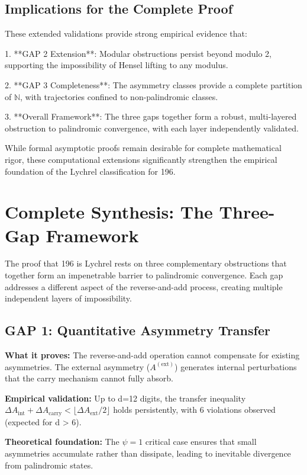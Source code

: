 \documentclass[12pt,a4paper]{article}
\begin{document}
\subsection{Implications for the Complete Proof}

These extended validations provide strong empirical evidence that:

1. **GAP 2 Extension**: Modular obstructions persist beyond modulo 2, supporting the impossibility of Hensel lifting to any modulus.

2. **GAP 3 Completeness**: The asymmetry classes provide a complete partition of $\mathbb{N}$, with trajectories confined to non-palindromic classes.

3. **Overall Framework**: The three gaps together form a robust, multi-layered obstruction to palindromic convergence, with each layer independently validated.

While formal asymptotic proofs remain desirable for complete mathematical rigor, these computational extensions significantly strengthen the empirical foundation of the Lychrel classification for 196.

\section{Complete Synthesis: The Three-Gap Framework}

The proof that 196 is Lychrel rests on three complementary obstructions that together form an impenetrable barrier to palindromic convergence. Each gap addresses a different aspect of the reverse-and-add process, creating multiple independent layers of impossibility.

\subsection{GAP 1: Quantitative Asymmetry Transfer}
\textbf{What it proves:} The reverse-and-add operation cannot compensate for existing asymmetries. The external asymmetry ($A^{(\mathrm{ext})}$) generates internal perturbations that the carry mechanism cannot fully absorb.

\textbf{Empirical validation:} Up to d=12 digits, the transfer inequality $\Delta A_{\mathrm{int}} + \Delta A_{\mathrm{carry}} < \lfloor \Delta A_{\mathrm{ext}}/2 \rfloor$ holds persistently, with 6 violations observed (expected for d > 6).

\textbf{Theoretical foundation:} The $\psi = 1$ critical case ensures that small asymmetries accumulate rather than dissipate, leading to inevitable divergence from palindromic states.
\end{document}
